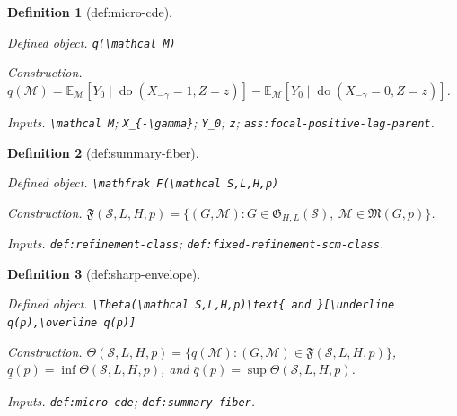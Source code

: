 \documentclass{article}
\newtheorem{definition}{Definition}
\begin{document}
\begin{definition}[def:micro-cde]\label{def:micro-cde}
\par\smallskip\noindent\emph{Defined object.} \texttt{q(\textbackslash{}\allowbreak{}mathcal M)}
\par\smallskip\noindent\emph{Construction.} \(q(\mathcal M)=\mathbb E_{\mathcal M}[Y_0\mid\operatorname{do}(X_{-\gamma}=1,Z=z)]-\mathbb E_{\mathcal M}[Y_0\mid\operatorname{do}(X_{-\gamma}=0,Z=z)]\).
\par\smallskip\noindent\emph{Inputs.} \texttt{\textbackslash{}\allowbreak{}mathcal M}; \texttt{X\_\allowbreak{}\{-\allowbreak{}\textbackslash{}\allowbreak{}gamma\}\allowbreak{}}; \texttt{Y\_\allowbreak{}0}; \texttt{z}; \texttt{ass:\allowbreak{}focal-\allowbreak{}positive-\allowbreak{}lag-\allowbreak{}parent}.
\end{definition}

\begin{definition}[def:summary-fiber]\label{def:summary-fiber}
\par\smallskip\noindent\emph{Defined object.} \texttt{\textbackslash{}\allowbreak{}mathfrak F(\textbackslash{}\allowbreak{}mathcal S,\allowbreak{}L,\allowbreak{}H,\allowbreak{}p)}
\par\smallskip\noindent\emph{Construction.} \(\mathfrak F(\mathcal S,L,H,p)=\{(G,\mathcal M):G\in\mathfrak G_{H,L}(\mathcal S),\ \mathcal M\in\mathfrak M(G,p)\}\).
\par\smallskip\noindent\emph{Inputs.} \texttt{def:\allowbreak{}refinement-\allowbreak{}class}; \texttt{def:\allowbreak{}fixed-\allowbreak{}refinement-\allowbreak{}scm-\allowbreak{}class}.
\end{definition}

\begin{definition}[def:sharp-envelope]\label{def:sharp-envelope}
\par\smallskip\noindent\emph{Defined object.} \texttt{\textbackslash{}\allowbreak{}Theta(\textbackslash{}\allowbreak{}mathcal S,\allowbreak{}L,\allowbreak{}H,\allowbreak{}p)\textbackslash{}\allowbreak{}text\{ and \}\allowbreak{}[\textbackslash{}\allowbreak{}underline q(p),\allowbreak{}\textbackslash{}\allowbreak{}overline q(p)]}
\par\smallskip\noindent\emph{Construction.} \(\Theta(\mathcal S,L,H,p)=\{q(\mathcal M):(G,\mathcal M)\in\mathfrak F(\mathcal S,L,H,p)\}\), \(\underline q(p)=\inf\Theta(\mathcal S,L,H,p)\), and \(\overline q(p)=\sup\Theta(\mathcal S,L,H,p)\).
\par\smallskip\noindent\emph{Inputs.} \texttt{def:\allowbreak{}micro-\allowbreak{}cde}; \texttt{def:\allowbreak{}summary-\allowbreak{}fiber}.
\end{definition}
\end{document}
